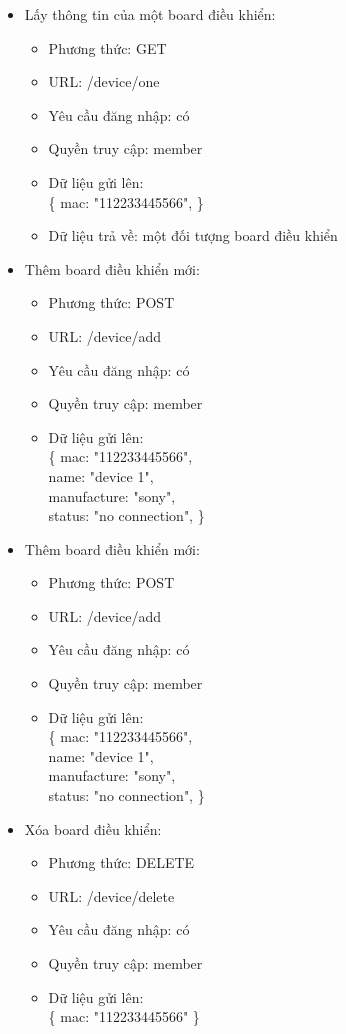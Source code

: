 \documentclass[a4paper,12pt,oneside]{article}
\begin{document}
\begin{itemize}
\begin{itemize}
\item Lấy thông tin của một board điều khiển:
	\begin{itemize}
	\item Phương thức: GET
	\item URL: /device/one
	\item Yêu cầu đăng nhập: có
	\item Quyền truy cập: member
	\item Dữ liệu gửi lên:\\ 
		\{
  			mac: "112233445566",
  		\}
  	\item Dữ liệu trả về: một đối tượng board điều khiển
	\end{itemize} 

\item Thêm board điều khiển mới:
	\begin{itemize}
	\item Phương thức: POST
	\item URL: /device/add
	\item Yêu cầu đăng nhập: có
	\item Quyền truy cập: member
	\item Dữ liệu gửi lên:\\ 
		\{
  			mac: "112233445566",\\
  			name: "device 1",\\
  			manufacture: "sony",\\
  			status: "no connection",
		\}
	\end{itemize} 

\item Thêm board điều khiển mới:
	\begin{itemize}
	\item Phương thức: POST
	\item URL: /device/add
	\item Yêu cầu đăng nhập: có
	\item Quyền truy cập: member
	\item Dữ liệu gửi lên:\\ 
		\{
  			mac: "112233445566",\\
  			name: "device 1",\\
  			manufacture: "sony",\\
  			status: "no connection",
		\}
	\end{itemize} 


\item Xóa board điều khiển:
	\begin{itemize}
	\item Phương thức: DELETE
	\item URL: /device/delete
	\item Yêu cầu đăng nhập: có
	\item Quyền truy cập: member
	\item Dữ liệu gửi lên:\\ 
		\{
  			mac: "112233445566"
		\}
	\end{itemize} 
\end{itemize}


\end{itemize}
\end{document}
